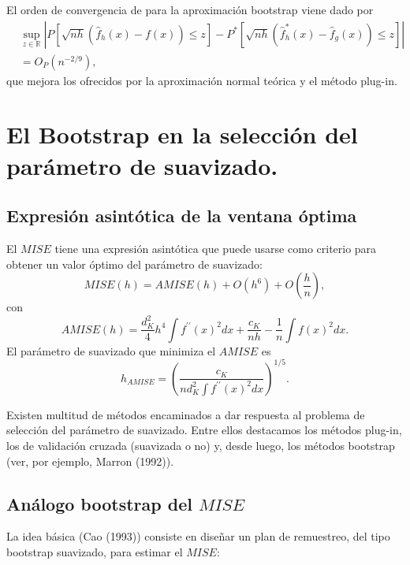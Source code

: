 \documentclass[
]{book}
\theoremstyle{break}
\theoremstyle{nonumberplain}
\begin{document}
El orden de convergencia de para la aproximación bootstrap viene dado por
\[\begin{aligned}
&\sup_{z\in \mathbb{R}}\left\vert P\left[ \sqrt{nh}\left( \hat{f}
_{h}\left( x \right) -f\left( x \right) \right) \leq z\right] -P^{\ast}\left[ 
\sqrt{nh}\left( \hat{f}_{h}^{\ast}\left( x \right) -\hat{f}_{g}\left(
x \right) \right) \leq z\right] \right\vert \\
&= O_{P}\left( n^{-2/9} \right),\end{aligned}\]que mejora los ofrecidos
por la aproximación normal teórica y el método plug-in.

\section{El Bootstrap en la selección del parámetro de suavizado.}\label{el-bootstrap-en-la-selecciuxf3n-del-paruxe1metro-de-suavizado.}

\subsection{Expresión asintótica de la ventana óptima}\label{expresiuxf3n-asintuxf3tica-de-la-ventana-uxf3ptima}

El \(MISE\) tiene una expresión asintótica que puede usarse como criterio
para obtener un valor óptimo del parámetro de
suavizado:\[MISE\left( h \right) =AMISE\left( h \right) +O\left( h^{6} \right) +O\left( 
\frac{h}{n} \right),\]con\[AMISE\left( h \right) =\frac{d_{K}^2}{4}h^{4}\int f^{\prime \prime }\left(
x \right)^2dx+\frac{c_{K}}{nh}-\frac{1}{n}\int f\left( x \right)^2dx.\]El
parámetro de suavizado que minimiza el \(AMISE\)
es\[h_{AMISE}=\left( \frac{c_{K}}{nd_{K}^2\int f^{\prime \prime }\left(
x \right)^2dx} \right)^{1/5}.\]

Existen multitud de métodos encaminados a dar respuesta al problema de
selección del parámetro de suavizado. Entre ellos destacamos los métodos
plug-in, los de validación cruzada (suavizada o no) y, desde luego, los
métodos bootstrap (ver, por ejemplo, Marron (1992)).

\subsection{\texorpdfstring{Análogo bootstrap del \(MISE\)}{Análogo bootstrap del MISE}}\label{anuxe1logo-bootstrap-del-mise}

La idea básica (Cao (1993)) consiste en diseñar un plan de remuestreo,
del tipo bootstrap suavizado, para estimar el \(MISE\):
\end{document}
